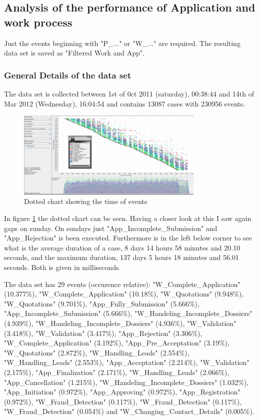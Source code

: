 \subsection{Analysis of the performance of Application and work process}

Just the events beginning with "P\_..." or "W\_..." are required. The resulting data set is saved as "Filtered Work and App".

\subsubsection{General Details of the data set}
The data set is collected between 1st of 0ct 2011 (saturday), 00:38:44 and 14th of Mar 2012 (Wednesday), 16:04:54 and contains 13087 cases with 230956 events. 

\begin{figure}[!htbp]
\centering
\includegraphics[width = 0.8\textwidth]{AppWorkDot.PNG}
\caption{Dotted chart showing the time of events}
\label{fig:AppWorkTimeFlow}
\end{figure}

In figure \ref{fig:AppWorkTimeFlow} the dotted chart can be seen. Having a closer look at this I saw again gaps on sunday. On sundays just "App\_Incomplete\_Submission" and "App\_Rejection" is been executed. Furthermore is in the left below corner to see what is the average duration of a case, 8 days 14 hours 58 minutes and 20.10 seconds, and the maximum duration, 137 days 5 hours 18 minutes and 56.01 seconds. Both is given in milliseconds.

The data set has 29 events (occurence relative): 
"W\_Complete\_Application" (10.377\%), "W\_Complete\_Application" (10.18\%), "W\_Quotations" (9.948\%), "W\_Quotations" (9.701\%), "App\_Fully\_Submission" (5.666\%), "App\_Incomplete\_Submission" (5.666\%), "W\_Handeling\_Incomplete\_Dossiers" (4.939\%), "W\_Handeling\_Incomplete\_Dossiers" (4.936\%), "W\_Validation" (3.418\%), "W\_Validation" (3.417\%), "App\_Rejection" (3.306\%), "W\_Complete\_Application" (3.192\%), "App\_Pre\_Acceptation" (3.19\%), "W\_Quotations" (2.872\%), "W\_Handling\_Leads" (2.554\%), "W\_Handling\_Leads" (2.553\%), "App\_Acceptation" (2.214\%), "W\_Validation" (2.175\%), "App\_Finalization" (2.171\%), "W\_Handling\_Leads" (2.066\%), "App\_Cancellation" (1.215\%), "W\_Handeling\_Incomplete\_Dossiers" (1.032\%), "App\_Initiation" (0.972\%), "App\_Approving" (0.972\%), "App\_Registration" (0.972\%), "W\_Fraud\_Detection" (0.117\%), "W\_Fraud\_Detection" (0.117\%), "W\_Fraud\_Detection" (0.054\%) and "W\_Changing\_Contact\_Details" (0.005\%).

